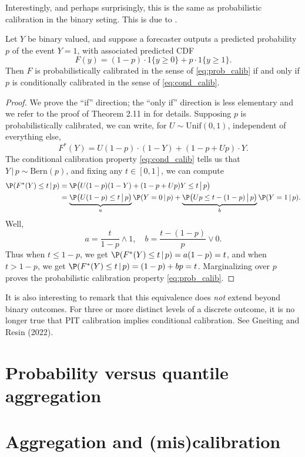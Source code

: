 \documentclass{article}
\begin{document}
Interestingly, and perhaps surprisingly, this is the same as probabilistic
calibration in the binary seting. This is due to \citet{gneiting2013combining}. 

\begin{theorem}
Let $Y$ be binary valued, and suppose a forecaster outputs a predicted
probability $p$ of the event $Y = 1$, with associated predicted CDF 
\[
F(y) = (1-p) \cdot 1\{y \geq 0\} +  p \cdot 1\{y \geq 1\}.
\]
Then $F$ is probabilistically calibrated in the sense of \eqref{eq:prob_calib}
if and only if $p$ is conditionally calibrated in the sense of
\eqref{eq:cond_calib}. 
\end{theorem}

\begin{proof}
We prove the ``if'' direction; the ``only if'' direction is less elementary and 
we refer to the proof of Theorem 2.11 in \citet{gneiting2013combining} for
details. Supposing $p$ is probabilistically calibrated, we can write, for $U
\sim \mathrm{Unif}(0,1)$, independent of everything else, 
\[
F^*(Y) = U (1-p) \cdot (1-Y) + (1-p + U p) \cdot Y.
\]
The conditional calibration property \eqref{eq:cond_calib} tells us that
$Y\,|\,p \sim \mathrm{Bern}(p)$, and fixing any $t \in [0,1]$, we can compute   
\begin{align*}
\P(F^*(Y) \leq t \,|\, p) 
&= \P\big(U (1-p) (1-Y) + (1-p + U p) Y \leq t \,\big|\, p \big) \\
&= \underbrace{\P\big(U (1-p) \leq t \,\big|\, p \big)}_{a} \P( Y=0 \,|\, p) +  
\underbrace{\P\big(U p \leq t-(1-p) \,\big|\, p \big)}_{b} \P( Y=1 \,|\, p).
\end{align*}
Well, 
\[
a = \frac{t}{1-p} \wedge 1, 
\quad
b = \frac{t-(1-p)}{p} \vee 0.
\]
Thus when $t \leq 1-p$, we get $\P(F^*(Y) \leq t \,|\, p) = a(1-p) = t$, and
when $t > 1-p$, we get $\P(F^*(Y) \leq t \,|\, p) = (1-p) + bp =
t$. Marginalizing over $p$ proves the probabilistic calibration property
\eqref{eq:prob_calib}.  
\end{proof}

It is also interesting to remark that this equivalence does \emph{not} extend
beyond binary outcomes. For three or more distinct levels of a discrete outcome,
it is no longer true that PIT calibration implies conditional calibration. See 
Gneiting and Resin (2022).   

\section{Probability versus quantile aggregation}
\label{sec:prob_vs_quant}

\section{Aggregation and (mis)calibration}



\end{document}

